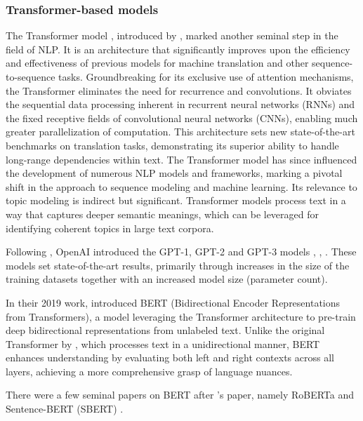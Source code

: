 \documentclass{article}
\begin{document}
\subsubsection{Transformer-based models}
The Transformer model \cite{vaswani_attention_2017}, introduced by \citeauthor{vaswani_attention_2017}, marked another seminal step in the field of NLP. It is an architecture that significantly improves upon the efficiency and effectiveness of previous models for machine translation and other sequence-to-sequence tasks. Groundbreaking for its exclusive use of attention mechanisms, the Transformer eliminates the need for recurrence and convolutions. It obviates the sequential data processing inherent in recurrent neural networks (RNNs) and the fixed receptive fields of convolutional neural networks (CNNs), enabling much greater parallelization of computation. This architecture sets new state-of-the-art benchmarks on translation tasks, demonstrating its superior ability to handle long-range dependencies within text. The Transformer model has since influenced the development of numerous NLP models and frameworks, marking a pivotal shift in the approach to sequence modeling and machine learning. Its relevance to topic modeling is indirect but significant. Transformer models process text in a way that captures deeper semantic meanings, which can be leveraged for identifying coherent topics in large text corpora.

Following \citet{vaswani_attention_2017}, OpenAI introduced the GPT-1, GPT-2 and GPT-3 models \cite{radford_improving_nodate}, \cite{radford_language_nodate}, \cite{brown_language_2020}. These models set state-of-the-art results, primarily through increases in the size of the training datasets together with an increased model size (parameter count).

In their 2019 work, \citet{devlin_bert_2019} introduced BERT (Bidirectional Encoder Representations from Transformers), a model leveraging the Transformer architecture to pre-train deep bidirectional representations from unlabeled text. Unlike the original Transformer by \citet{vaswani_attention_2017}, which processes text in a unidirectional manner, BERT enhances understanding by evaluating both left and right contexts across all layers, achieving a more comprehensive grasp of language nuances.

There were a few seminal papers on BERT after \citeauthor{devlin_bert_2019}'s paper, namely RoBERTa \cite{liu_roberta_2019} and Sentence-BERT (SBERT) \cite{reimers_sentence-bert_2019}.
\end{document}
